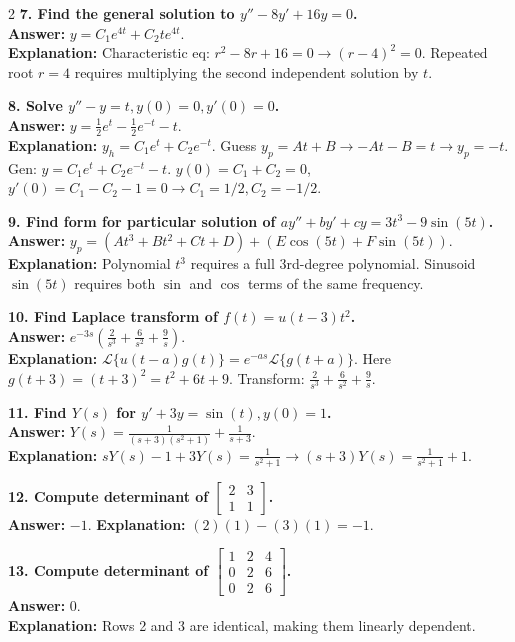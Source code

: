 \documentclass[4pt]{extarticle}
\begin{document}
\begin{multicols}{2}
\textbf{7. Find the general solution to $y'' - 8y' + 16y = 0$.} \\
\textbf{Answer:} $y = C_1e^{4t} + C_2t e^{4t}$. \\
\textbf{Explanation:} Characteristic eq: $r^2 - 8r + 16 = 0 \rightarrow (r-4)^2 = 0$. Repeated root $r=4$ requires multiplying the second independent solution by $t$.

\textbf{8. Solve $y'' - y = t, y(0)=0, y'(0)=0$.} \\
\textbf{Answer:} $y = \frac{1}{2}e^t - \frac{1}{2}e^{-t} - t$. \\
\textbf{Explanation:} $y_h = C_1e^t + C_2e^{-t}$. Guess $y_p = At+B \rightarrow -At-B=t \rightarrow y_p = -t$. Gen: $y = C_1e^t + C_2e^{-t} - t$. $y(0)=C_1+C_2=0$, $y'(0)=C_1-C_2-1=0 \rightarrow C_1=1/2, C_2=-1/2$.

\textbf{9. Find form for particular solution of $ay'' + by' + cy = 3t^3 - 9 \sin(5t)$.} \\
\textbf{Answer:} $y_p = (At^3 + Bt^2 + Ct + D) + (E \cos(5t) + F \sin(5t))$. \\
\textbf{Explanation:} Polynomial $t^3$ requires a full 3rd-degree polynomial. Sinusoid $\sin(5t)$ requires both $\sin$ and $\cos$ terms of the same frequency.

\textbf{10. Find Laplace transform of $f(t)=u(t-3)t^2$.} \\
\textbf{Answer:} $e^{-3s} (\frac{2}{s^3} + \frac{6}{s^2} + \frac{9}{s})$. \\
\textbf{Explanation:} $\mathcal{L}\{u(t-a)g(t)\} = e^{-as}\mathcal{L}\{g(t+a)\}$. Here $g(t+3) = (t+3)^2 = t^2 + 6t + 9$. Transform: $\frac{2}{s^3} + \frac{6}{s^2} + \frac{9}{s}$.

\textbf{11. Find $Y(s)$ for $y' + 3y = \sin(t), y(0)=1$.} \\
\textbf{Answer:} $Y(s) = \frac{1}{(s+3)(s^2+1)} + \frac{1}{s+3}$. \\
\textbf{Explanation:} $sY(s) - 1 + 3Y(s) = \frac{1}{s^2+1} \rightarrow (s+3)Y(s) = \frac{1}{s^2+1} + 1$.

\textbf{12. Compute determinant of $\begin{bmatrix} 2 & 3 \\ 1 & 1 \end{bmatrix}$.} \\
\textbf{Answer:} $-1$. \textbf{Explanation:} $(2)(1) - (3)(1) = -1$.

\textbf{13. Compute determinant of $\begin{bmatrix} 1 & 2 & 4 \\ 0 & 2 & 6 \\ 0 & 2 & 6 \end{bmatrix}$.} \\
\textbf{Answer:} $0$. \\
\textbf{Explanation:} Rows 2 and 3 are identical, making them linearly dependent.


\end{multicols}
\end{document}
